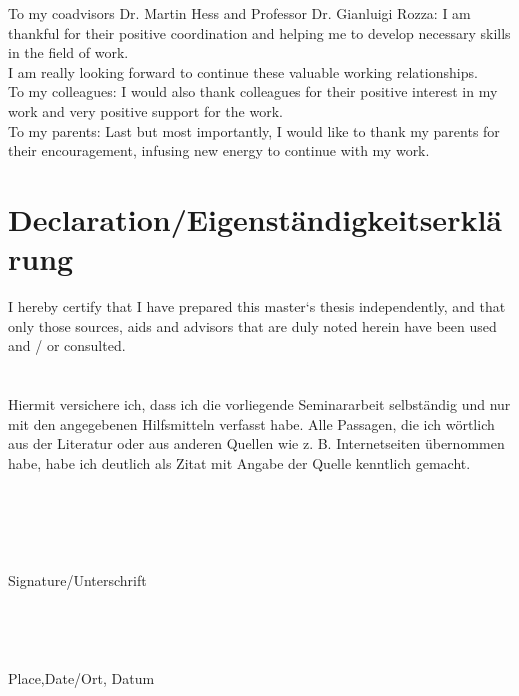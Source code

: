 \documentclass[a4paper]{book}
\begin{document}
To my coadvisors Dr. Martin Hess and Professor Dr. Gianluigi Rozza: I am thankful for their positive coordination and helping me to develop necessary skills in the field of work. \\

I am really looking forward to continue these valuable working relationships.\\

To my colleagues: I would also thank colleagues for their positive interest in my work and very positive support for the work.\\

To my parents:  Last but most importantly, I would like to thank my parents for their encouragement, infusing new energy to continue with my work.

\newpage

\section{Declaration/Eigenst\"andigkeitserkl\"arung}

I hereby certify that I have prepared this master‘s thesis independently, and that only those sources, aids and advisors that are duly noted herein have been used and / or consulted.\\
${}$\\
${}$\\
Hiermit versichere ich, dass ich die vorliegende Seminararbeit selbständig und
nur mit den angegebenen Hilfsmitteln verfasst habe. Alle Passagen, die ich
wörtlich aus der Literatur oder aus anderen Quellen wie z. B. Internetseiten
übernommen habe, habe ich deutlich als Zitat mit Angabe der Quelle kenntlich
gemacht.\\
${}$\\
${}$\\
${}$\\
${}$\\
${}$\\
Signature/Unterschrift
${}$\\
${}$\\
${}$\\
${}$\\
${}$\\
Place,Date/Ort, Datum











\newpage
\end{document}
